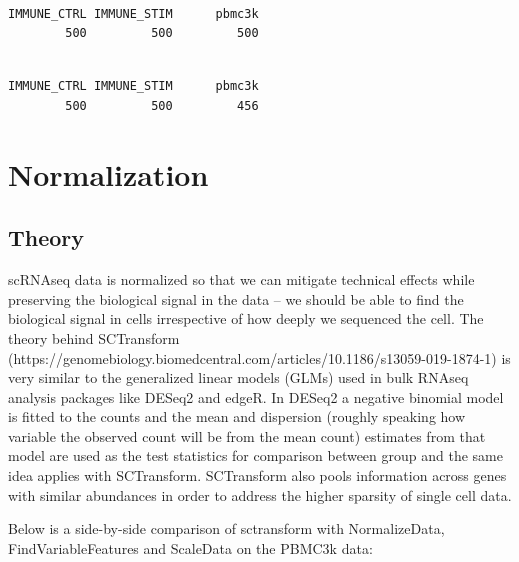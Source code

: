 \documentclass[
  letterpaper,
  DIV=11,
  numbers=noendperiod]{scrreprt}
\newenvironment{Shaded}{\begin{snugshade}}{\end{snugshade}}
\newcommand{\FunctionTok}[1]{\textcolor[rgb]{0.28,0.35,0.67}{#1}}
\newcommand{\NormalTok}[1]{\textcolor[rgb]{0.00,0.23,0.31}{#1}}
\newcommand{\SpecialCharTok}[1]{\textcolor[rgb]{0.37,0.37,0.37}{#1}}
\begin{document}
\begin{verbatim}

IMMUNE_CTRL IMMUNE_STIM      pbmc3k 
        500         500         500 
\end{verbatim}

\begin{Shaded}
\end{Shaded}

\begin{verbatim}

IMMUNE_CTRL IMMUNE_STIM      pbmc3k 
        500         500         456 
\end{verbatim}

\section{Normalization}\label{normalization}

\subsection{Theory}\label{theory}

scRNAseq data is normalized so that we can mitigate technical effects
while preserving the biological signal in the data -- we should be able
to find the biological signal in cells irrespective of how deeply we
sequenced the cell. The theory behind SCTransform
(https://genomebiology.biomedcentral.com/articles/10.1186/s13059-019-1874-1)
is very similar to the generalized linear models (GLMs) used in bulk
RNAseq analysis packages like DESeq2 and edgeR. In DESeq2 a negative
binomial model is fitted to the counts and the mean and dispersion
(roughly speaking how variable the observed count will be from the mean
count) estimates from that model are used as the test statistics for
comparison between group and the same idea applies with SCTransform.
SCTransform also pools information across genes with similar abundances
in order to address the higher sparsity of single cell data.

Below is a side-by-side comparison of sctransform with NormalizeData,
FindVariableFeatures and ScaleData on the PBMC3k data:
\end{document}
